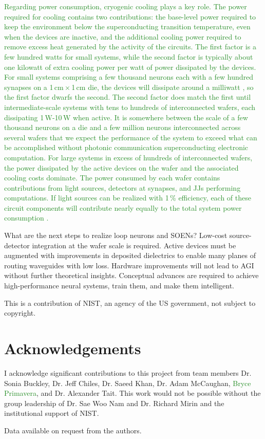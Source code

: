 \documentclass{article}
\begin{document}
\begin{multicols}{2}
\textcolor{ForestGreen}{Regarding power consumption, cryogenic cooling plays a key role. The power required for cooling  contains two contributions: the base-level power required to keep the environment below the superconducting transition temperature, even when the devices are inactive, and the additional cooling power required to remove excess heat generated by the activity of the circuits. The first factor is a few hundred watts for small systems, while the second factor is typically about one kilowatt of extra cooling power per watt of power dissipated by the devices. For small systems comprising a few thousand neurons each with a few hundred synapses on a 1\,cm\,$\times$\,1\,cm die, the devices will dissipate around a milliwatt \cite{sh2019}, so the first factor dwarfs the second. The second factor does match the first until intermediate-scale systems with tens to hundreds of interconnected wafers, each dissipating 1\,W-10\,W when active. It is somewhere between the scale of a few thousand neurons on a die and a few million neurons interconnected across several wafers that we expect the performance of the system to exceed what can be accomplished without photonic communication superconducting electronic computation. For large systems in excess of hundreds of interconnected wafers, the power dissipated by the active devices on the wafer and the associated cooling costs dominate. The power consumed by each wafer contains contributions from light sources, detectors at synapses, and JJs performing computations. If light sources can be realized with 1\,\% efficiency, each of these circuit components will contribute nearly equally to the total system power consumption \cite{sh2020}.}

What are the next steps to realize loop neurons and SOENs? Low-cost source-detector integration at the wafer scale is required. Active devices must be augmented with improvements in deposited dielectrics to enable many planes of routing waveguides with low loss. Hardware improvements will not lead to AGI without further theoretical insights. Conceptual advances are required to achieve high-performance neural systems, train them, and make them intelligent.

\vspace{2em}
This is a contribution of NIST, an agency of the US government, not subject to copyright.

\section{\label{sec:acknowledgements}Acknowledgements}
I acknowledge significant contributions to this project from team members Dr. Sonia Buckley, Dr. Jeff Chiles, Dr. Saeed Khan, Dr. Adam McCaughan, \textcolor{ForestGreen}{Bryce Primavera}, and Dr. Alexander Tait. This work would not be possible without the group leadership of Dr. Sae Woo Nam and Dr. Richard Mirin and the institutional support of NIST.

\vspace{2em}
Data available on request from the authors.




\end{multicols}
\end{document}
